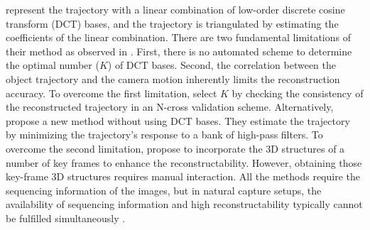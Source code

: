 \citet{Park_ECCV2010} represent the trajectory with a linear combination of low-order discrete cosine transform (DCT) bases, and the trajectory is triangulated by estimating the coefficients of the linear combination.
There are two fundamental limitations of their method as observed in  \citet{Valmadre_CVPR2012}.
First, there is no automated scheme to determine the optimal number ($K$) of DCT bases.
Second, the correlation between the object trajectory and the camera motion inherently limits the reconstruction accuracy.
To overcome the first limitation, \citet{park20153d} select $K$ by checking the consistency of the reconstructed trajectory in an N-cross validation scheme.
Alternatively, \citet{Valmadre_CVPR2012} propose a new method without using DCT bases. They estimate the trajectory by minimizing the trajectory's response to a bank of high-pass filters.
To overcome the second limitation,
\citet{ZhuCL_CVPR11} propose to incorporate the 3D structures of a number of key frames to enhance the reconstructability. However, obtaining those key-frame 3D structures requires manual interaction. 
All the methods \cite{Park_ECCV2010,Valmadre_CVPR2012,ZhuCL_CVPR11} require the sequencing information of the images, 
but in natural capture setups, the availability of sequencing information and high reconstructability typically cannot be fulfilled simultaneously \cite{ZhuCL_CVPR11,park20153d}. 



